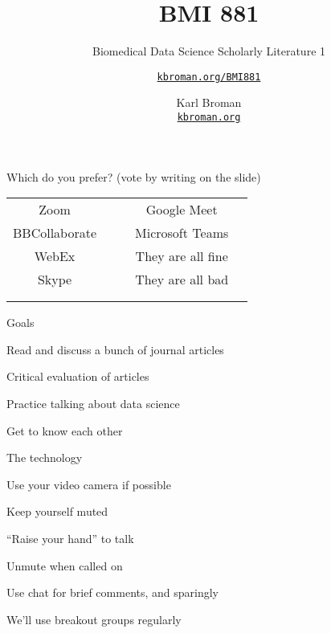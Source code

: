 \documentclass[aspectratio=169,12pt,t]{beamer}
\title{BMI 881}
\subtitle{Biomedical Data Science Scholarly Literature 1}
\author{\href{https://kbroman.org/BMI881}{\tt kbroman.org/BMI881} }
\institute{}
\date{\small \hspace{3in} Karl Broman \\
  \hspace{3in} \href{https://kbroman.org}{\color{foreground}
    \small \tt kbroman.org}}
\begin{document}
\begin{frame}[c]{Which do you prefer? {\hilit (vote by writing on the slide)}}

\renewcommand{\arraystretch}{2}
  \begin{tabular}{|c|c|c|c|c|} \cline{1-2} \cline{4-5}
    Zoom            &\hspace{1in} && Google Meet        & \hspace{1in}  \\ \cline{1-2} \cline{4-5}
    BBCollaborate   &&& Microsoft Teams                 & \\ \cline{1-2} \cline{4-5}
    WebEx           &&& They are all fine  & \\ \cline{1-2} \cline{4-5}
    Skype           &&& They are all bad   & \\ \cline{1-2} \cline{4-5}
                    &&&                    & \\ \cline{1-2} \cline{4-5}
                    &&&                    & \\ \cline{1-2} \cline{4-5}
   \end{tabular}

\end{frame}


{
\frame{
  \titlepage
} }




\begin{frame}{Goals}

  \bbi
\item Read and discuss a bunch of journal articles
\item Critical evaluation of articles
\item Practice talking about data science
\item Get to know each other
  \ei

\end{frame}




\begin{frame}{The technology}

  \bbi
\item Use your video camera if possible
\item Keep yourself muted
\item ``Raise your hand'' to talk
\item Unmute when called on
\item Use chat for brief comments, and sparingly
\item We'll use breakout groups regularly
  \ei

\end{frame}
\end{document}
